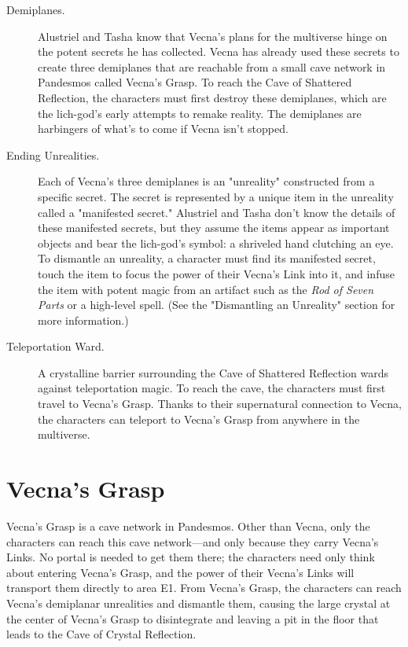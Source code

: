 \documentclass[10pt,a4paper,twoside,bg=print,twocolumn,openany,nodeprecatedcode]{dndbook}
\begin{document}
\begin{description}
\item[Demiplanes.]
Alustriel and Tasha know that Vecna's plans for the multiverse hinge on the potent secrets he has collected. Vecna has already used these secrets to create three demiplanes that are reachable from a small cave network in Pandesmos called Vecna's Grasp. To reach the Cave of Shattered Reflection, the characters must first destroy these demiplanes, which are the lich-god's early attempts to remake reality. The demiplanes are harbingers of what's to come if Vecna isn't stopped.
\item[Ending Unrealities.]
Each of Vecna's three demiplanes is an "unreality" constructed from a specific secret. The secret is represented by a unique item in the unreality called a "manifested secret." Alustriel and Tasha don't know the details of these manifested secrets, but they assume the items appear as important objects and bear the lich-god's symbol: a shriveled hand clutching an eye. To dismantle an unreality, a character must find its manifested secret, touch the item to focus the power of their Vecna's Link into it, and infuse the item with potent magic from an artifact such as the \textit{Rod of Seven Parts} or a high-level spell. (See the "Dismantling an Unreality" section for more information.)
\item[Teleportation Ward.]
A crystalline barrier surrounding the Cave of Shattered Reflection wards against teleportation magic. To reach the cave, the characters must first travel to Vecna's Grasp. Thanks to their supernatural connection to Vecna, the characters can teleport to Vecna's Grasp from anywhere in the multiverse.
\end{description}

\section{Vecna's Grasp}
Vecna's Grasp is a cave network in Pandesmos. Other than Vecna, only the characters can reach this cave network—and only because they carry Vecna's Links. No portal is needed to get them there; the characters need only think about entering Vecna's Grasp, and the power of their Vecna's Links will transport them directly to area E1. From Vecna's Grasp, the characters can reach Vecna's demiplanar unrealities and dismantle them, causing the large crystal at the center of Vecna's Grasp to disintegrate and leaving a pit in the floor that leads to the Cave of Crystal Reflection.
\end{document}
